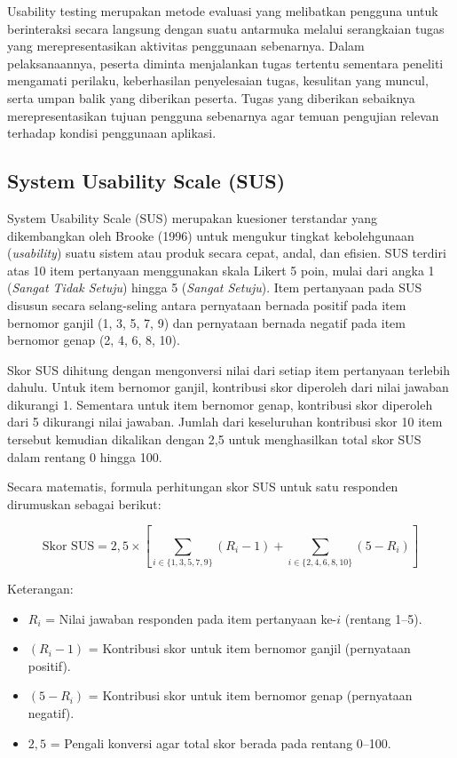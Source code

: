 \documentclass[12pt,a4paper]{report}
\begin{document}
Usability testing merupakan metode evaluasi yang melibatkan pengguna untuk berinteraksi secara langsung dengan suatu antarmuka melalui serangkaian tugas yang merepresentasikan aktivitas penggunaan sebenarnya. Dalam pelaksanaannya, peserta diminta menjalankan tugas tertentu sementara peneliti mengamati perilaku, keberhasilan penyelesaian tugas, kesulitan yang muncul, serta umpan balik yang diberikan peserta. Tugas yang diberikan sebaiknya merepresentasikan tujuan pengguna sebenarnya agar temuan pengujian relevan terhadap kondisi penggunaan aplikasi.

\subsection{System Usability Scale (SUS)}
System Usability Scale (SUS) merupakan kuesioner terstandar yang dikembangkan oleh Brooke (1996) untuk mengukur tingkat kebolehgunaan (\textit{usability}) suatu sistem atau produk secara cepat, andal, dan efisien. SUS terdiri atas 10 item pertanyaan menggunakan skala Likert 5 poin, mulai dari angka 1 (\textit{Sangat Tidak Setuju}) hingga 5 (\textit{Sangat Setuju}). Item pertanyaan pada SUS disusun secara selang-seling antara pernyataan bernada positif pada item bernomor ganjil (1, 3, 5, 7, 9) dan pernyataan bernada negatif pada item bernomor genap (2, 4, 6, 8, 10).

Skor SUS dihitung dengan mengonversi nilai dari setiap item pertanyaan terlebih dahulu. Untuk item bernomor ganjil, kontribusi skor diperoleh dari nilai jawaban dikurangi 1. Sementara untuk item bernomor genap, kontribusi skor diperoleh dari 5 dikurangi nilai jawaban. Jumlah dari keseluruhan kontribusi skor 10 item tersebut kemudian dikalikan dengan 2,5 untuk menghasilkan total skor SUS dalam rentang 0 hingga 100.

Secara matematis, formula perhitungan skor SUS untuk satu responden dirumuskan sebagai berikut:

\begin{equation}
\text{Skor SUS} = 2{,}5 \times \left[ \sum_{i \in \{1, 3, 5, 7, 9\}} (R_i - 1) + \sum_{i \in \{2, 4, 6, 8, 10\}} (5 - R_i) \right]
\end{equation}

\noindent Keterangan:
\begin{itemize}[label={--}]
    \item $R_i$ = Nilai jawaban responden pada item pertanyaan ke-$i$ (rentang 1--5).
    \item $(R_i - 1)$ = Kontribusi skor untuk item bernomor ganjil (pernyataan positif).
    \item $(5 - R_i)$ = Kontribusi skor untuk item bernomor genap (pernyataan negatif).
    \item $2{,}5$ = Pengali konversi agar total skor berada pada rentang 0--100.
\end{itemize}
\end{document}
